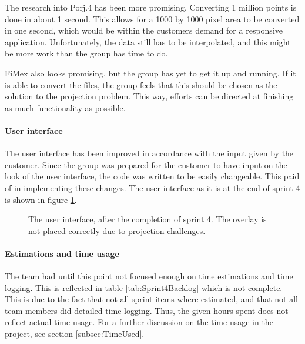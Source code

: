 \documentclass[11pt,a4paper,titlepage,oneside]{report}
\begin{document}
The research into Porj.4 has been more promising. Converting 1 million points is done in about 1 second. This allows for a 1000 by 1000 pixel area to be converted in one second, which would be within the customers demand for a responsive application. Unfortunately, the data still has to be interpolated, and this might be more work than the group has time to do.

FiMex also looks promising, but the group has yet to get it up and running. If it is able to convert the files, the group feels that this should be chosen as the solution to the projection problem. This way, efforts can be directed at finishing as much functionality as possible. 

\paragraph{User interface}
The user interface has been improved in accordance with the input given by the customer. Since the group was prepared for the customer to have input on the look of the user interface, the code was written to be easily changeable. This paid of in implementing these changes. The user interface as it is at the end of sprint 4 is shown in figure \ref{fig:UIAfterSprint4}.

\begin{figure}[t]
\begin{center}
\caption{The user interface, after the completion of sprint 4. The overlay is not placed correctly due to projection challenges.}
\label{fig:UIAfterSprint4}
\end{center}
\end{figure}

\paragraph{Estimations and time usage}
The team had until this point not focused enough on time estimations and time logging. This is reflected in table \ref{tab:Sprint4Backlog} which is not complete. This is due to the fact that not all sprint items where estimated, and that not all team members did detailed time logging. Thus, the given hours spent does not reflect actual time usage. For a further discussion on the time usage in the project, see section \ref{subsec:TimeUsed}.
\end{document}
